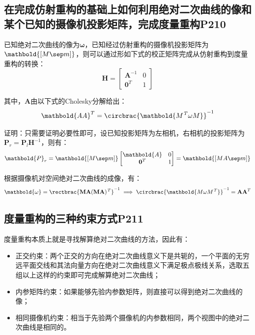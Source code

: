 \documentclass[11pt]{article}
\begin{document}
\subsection{在完成仿射重构的基础上如何利用绝对二次曲线的像和某个已知的摄像机投影矩阵，完成度量重构P210}
已知绝对二次曲线的像为$\mathbold{\omega}$，已知经过仿射重构的摄像机投影矩阵为$\mathbold{[M\sep m]}$，则可以通过形如下式的校正矩阵完成从仿射重构到度量重构的转换：
\begin{equation*}
  \mathbold{H}=\begin{bmatrix}
    \mathbold{A}^{-1} & 0 \\
    \mathbf{0}^T      & 1
  \end{bmatrix}
\end{equation*}\par
其中，$\mathbold{A}$由以下式的Cholesky分解给出：
\begin{equation*}
  \mathbold{AA}^T=\circbrac{\mathbold{M^\mathit{T}\omega M}}^{-1}
\end{equation*}\par
证明：只需要证明必要性即可，设已知投影矩阵为左相机，右相机的投影矩阵为$\mathbold{P}_r=\mathbold{P}_l\mathbold{H}^{-1}$，则有：
\begin{equation*}
  \mathbold{P}_r=\mathbold{[M\sep m]}\begin{bmatrix}
    \mathbold{A} & 0 \\
    \mathbf{0}^T & 1
  \end{bmatrix}= \mathbold{[MA\sep m]}
\end{equation*}\par
根据摄像机对空间绝对二次曲线的成像，有：
\begin{equation*}
  \mathbold{\omega}=\rectbrac{\mathbf{MA(MA)^\mathit{T}}}^{-1}\implies\circbrac{\mathbold{M\omega M^\mathit{T}}}^{-1}=\mathbf{AA}^T
\end{equation*}\par
\subsection{	度量重构的三种约束方式P211}
度量重构本质上就是寻找解算绝对二次曲线的方法，因此有：
\begin{itemize}
  \item 正交约束：两个正交的方向在绝对二次曲线意义下是共轭的，一个平面的无穷远平面交线和其法向量方向在绝对二次曲线意义下满足极点极线关系，选取五组以上这样的约束即可完成解算绝对二次曲线；
  \item 内参矩阵约束：如果能够先验内参数矩阵，则直接可以得到绝对二次曲线的像；
  \item 相同摄像机约束：相当于先验两个摄像机的内参数相同，两个视图中的绝对二次曲线是相同的。
\end{itemize}
\end{document}
